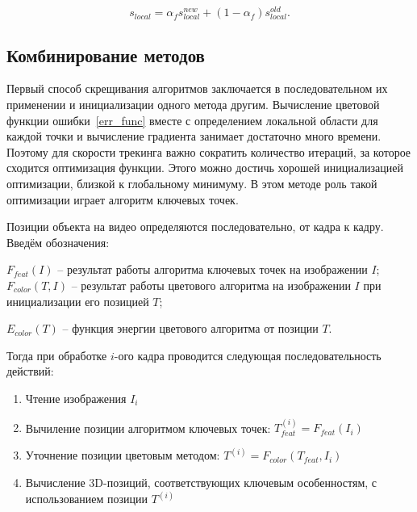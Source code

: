 \begin{equation}
s_{local} =  \alpha_f s_{local}^{new} + (1 - \alpha_f)  s_{local}^{old} 
\text{.}
\end{equation}


\subsection{Комбинирование методов}


Первый способ скрещивания алгоритмов заключается в последовательном их
применении и инициализации одного метода другим.
Вычисление цветовой функции ошибки~\ref{err_func} вместе с определением
локальной области для каждой точки и вычисление градиента занимает достаточно
много времени.
Поэтому для скорости трекинга важно сократить количество итераций, за которое
сходится оптимизация функции.
Этого можно достичь хорошей инициализацией оптимизации, близкой к глобальному
минимуму.
В этом методе роль такой оптимизации играет алгоритм ключевых точек.


Позиции объекта на видео определяются последовательно, от кадра к кадру.
Введём обозначения:

$F_{feat}(I)$ -- результат работы алгоритма ключевых точек на изображении $I$;
$F_{color}(T, I)$ -- результат работы цветового алгоритма на изображении $I$
при инициализации его позицией $T$;

$E_{color}(T)$ -- функция энергии цветового алгоритма от позиции $T$.

Тогда при обработке $i$-ого кадра проводится следующая последовательность
действий:

\begin{enumerate}
\item Чтение изображения $I_i$
\item Вычиление позиции алгоритмом ключевых точек:
    $T_{feat}^{(i)} = F_{feat}(I_i)$
\item Уточнение позиции цветовым методом:
    $T^{(i)} = F_{color}(T_{feat}, I_i)$
\item Вычисление  3D-позиций, соответствующих ключевым особенностям, с
    использованием позиции $T^{(i)}$
\end{enumerate}

